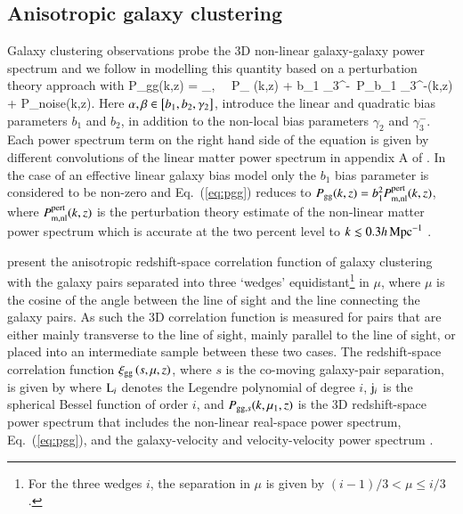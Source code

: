 \subsection{Anisotropic galaxy clustering}
\label{sec:clustering}
Galaxy clustering observations probe the 3D non-linear galaxy-galaxy power spectrum and we follow \citet{sanchez/etal:2017} in modelling this quantity based on a perturbation theory approach with
\be
\label{eq:pgg}
P_{\rm gg}(k,z) = \sum_{\alpha,\beta} \alpha\, \beta\, P_{\alpha
  \beta}(k,z) + b_1 \gamma_3^-\, P_{b_1 \gamma_3^-}(k,z) + P_{\rm noise}(k,z)\;.
\ee
Here $\alpha,\beta \in \left[ b_1, b_2, \gamma_2 \right]$, introduce the linear and quadratic bias parameters $b_1$ and $b_2$, in addition to the non-local bias parameters $ \gamma_2$ and $\gamma_3^-$.  Each power spectrum term on the right hand side of the equation is given by different convolutions of the linear matter power spectrum in appendix A of \citet{sanchez/etal:2017}.   In the case of an effective linear galaxy bias model \citep[see for example][]{vanuitert/etal:2018, abbott/etal:2018} only the $b_1$ bias parameter is considered to be non-zero and Eq.~(\ref{eq:pgg}) reduces to $P_{\rm gg}(k,z) =b_1^2 P_{\rm m, nl}^{\rm pert}(k,z)$, where $P_{\rm m, nl}^{\rm pert}(k,z)$ is the perturbation theory estimate of the non-linear matter power spectrum which is accurate at the two percent level to $k \lesssim 0.3 h \,{\rm Mpc}^{-1}$ \citep{sanchez/etal:2017}. 

\citet{sanchez/etal:2017} present the anisotropic redshift-space correlation function of galaxy clustering with the galaxy pairs separated into three `wedges' equidistant\footnote{For the three wedges $i$, the separation in $\mu$ is given by $(i-1)/3 < \mu \leq i/3$.} in $\mu$, where $\mu$ is the cosine of the angle between the line of sight and the line connecting the galaxy pairs.   As such the 3D correlation function is measured for pairs that are either mainly transverse to the line of sight, mainly parallel to the line of sight, or placed into an intermediate sample between these two cases.  The redshift-space correlation function $\xi_{\rm gg} \left( s,\mu,z \right)$, where $s$ is the co-moving galaxy-pair separation, is given by
where ${\rm L}_i$ denotes the Legendre polynomial of degree $i$, ${\rm j}_i$ is the spherical Bessel function of order $i$, and $P_{{\rm gg}, s}(k,\mu_1,z)$ is the 3D redshift-space power spectrum that includes the non-linear real-space power spectrum, Eq.~(\ref{eq:pgg}), and the galaxy-velocity and velocity-velocity power spectrum \citep[see][for details, including how the Alcock-Paczynski distortions are accounted for in the modelling]{sanchez/etal:2017}.   

